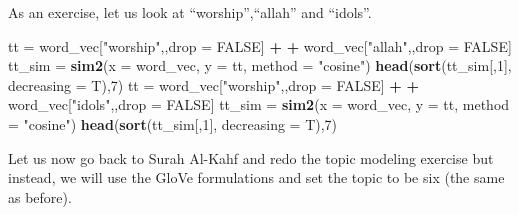 \documentclass[
]{article}
\newenvironment{Shaded}{\begin{snugshade}}{\end{snugshade}}
\newcommand{\AttributeTok}[1]{\textcolor[rgb]{0.13,0.29,0.53}{#1}}
\newcommand{\ConstantTok}[1]{\textcolor[rgb]{0.56,0.35,0.01}{#1}}
\newcommand{\DecValTok}[1]{\textcolor[rgb]{0.00,0.00,0.81}{#1}}
\newcommand{\FunctionTok}[1]{\textcolor[rgb]{0.13,0.29,0.53}{\textbf{#1}}}
\newcommand{\NormalTok}[1]{#1}
\newcommand{\OtherTok}[1]{\textcolor[rgb]{0.56,0.35,0.01}{#1}}
\newcommand{\SpecialCharTok}[1]{\textcolor[rgb]{0.81,0.36,0.00}{\textbf{#1}}}
\newcommand{\StringTok}[1]{\textcolor[rgb]{0.31,0.60,0.02}{#1}}
\begin{document}
\normalsize

As an exercise, let us look at ``worship'',``allah'' and ``idols''.

\footnotesize

\begin{Shaded}
\begin{Highlighting}[]
\NormalTok{tt }\OtherTok{=}\NormalTok{ word\_vec[}\StringTok{"worship"}\NormalTok{,,drop }\OtherTok{=} \ConstantTok{FALSE}\NormalTok{] }\SpecialCharTok{+} \SpecialCharTok{+}\NormalTok{ word\_vec[}\StringTok{"allah"}\NormalTok{,,drop }\OtherTok{=} \ConstantTok{FALSE}\NormalTok{]}
\NormalTok{tt\_sim }\OtherTok{=} \FunctionTok{sim2}\NormalTok{(}\AttributeTok{x =}\NormalTok{ word\_vec, }\AttributeTok{y =}\NormalTok{ tt, }\AttributeTok{method =} \StringTok{"cosine"}\NormalTok{)}
\FunctionTok{head}\NormalTok{(}\FunctionTok{sort}\NormalTok{(tt\_sim[,}\DecValTok{1}\NormalTok{], }\AttributeTok{decreasing =}\NormalTok{ T),}\DecValTok{7}\NormalTok{)}
\NormalTok{tt }\OtherTok{=}\NormalTok{ word\_vec[}\StringTok{"worship"}\NormalTok{,,drop }\OtherTok{=} \ConstantTok{FALSE}\NormalTok{] }\SpecialCharTok{+} \SpecialCharTok{+}\NormalTok{ word\_vec[}\StringTok{"idols"}\NormalTok{,,drop }\OtherTok{=} \ConstantTok{FALSE}\NormalTok{]}
\NormalTok{tt\_sim }\OtherTok{=} \FunctionTok{sim2}\NormalTok{(}\AttributeTok{x =}\NormalTok{ word\_vec, }\AttributeTok{y =}\NormalTok{ tt, }\AttributeTok{method =} \StringTok{"cosine"}\NormalTok{)}
\FunctionTok{head}\NormalTok{(}\FunctionTok{sort}\NormalTok{(tt\_sim[,}\DecValTok{1}\NormalTok{], }\AttributeTok{decreasing =}\NormalTok{ T),}\DecValTok{7}\NormalTok{)}
\end{Highlighting}
\end{Shaded}

\normalsize

Let us now go back to Surah Al-Kahf and redo the topic modeling exercise but instead, we will use the GloVe formulations and set the topic to be six (the same as before).

\footnotesize
\end{document}

